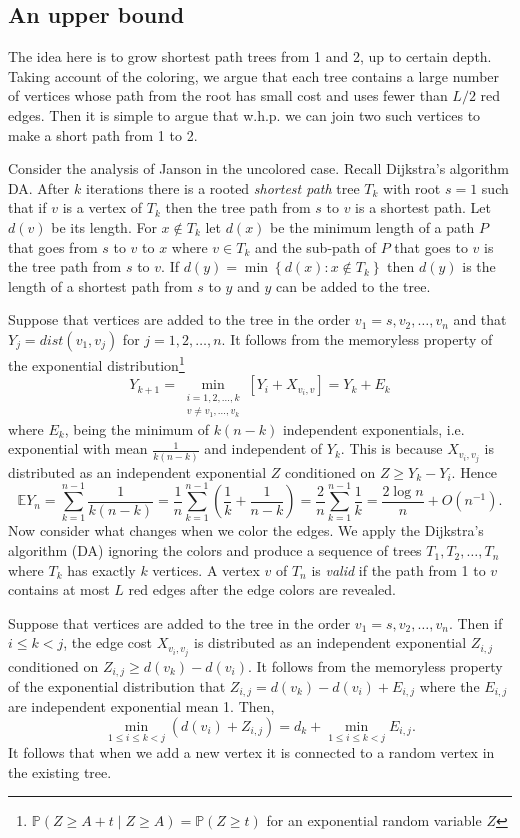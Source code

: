 \documentclass[12pt]{article}
\newcommand{\1}{\textbf{1}}
\newcommand{\set}[1]{\left\{#1\right\}}
\def\E{\mathbb{E}}
\def\Pr{\mathbb{P}}
\newcommand{\beq}[2]{\begin{equation}\label{#1}#2\end{equation}}
\begin{document}
\subsection{An upper bound}
The idea here is to grow shortest path trees from 1 and 2, up to certain depth. Taking account of the coloring, we argue that each tree contains a large number of vertices whose path from the root has small cost and uses fewer than $L/2$ red edges. Then it is simple to argue that w.h.p. we can join two such vertices to make a short path from 1 to 2. 

Consider the analysis of Janson \cite{J2} in the uncolored case. Recall Dijkstra's algorithm DA.
After $k$ iterations there is a rooted {\em shortest path} tree $T_k$ with root $s=1$ such that if
$v$ is a vertex of $T_k$ then the tree path from $s$ to $v$ is a shortest path. Let $d(v)$ be its length.
For $x\notin T_k$ let $d(x)$ be the minimum length of a path $P$ that goes from $s$ to $v$ to $x$ where $v\in T_k$ and the sub-path of $P$ that goes to $v$ is the tree path from $s$ to $v$. If $d(y)=\min\set{d(x):x\notin T_k}$ then $d(y)$ is the length of a shortest path from $s$ to $y$ and $y$ can be added to the tree.

Suppose that vertices are added to the tree in the order $v_1=s,v_2,\ldots,v_n$ and that $Y_j=dist(v_1,v_j)$ for $j=1,2,\ldots,n$. It follows from the memoryless property of the exponential distribution\footnote{$\Pr(Z\geq A+t\mid Z\geq A)=\Pr(Z\geq t)$ for an exponential random variable $Z$}
\[
Y_{k+1} = \min_{\substack{i=1,2,\ldots,k \\{v\neq v_1,\ldots,v_k}}}[Y_i+ X_{v_i,v}]=Y_k + E_k
\]
where $E_k$, being the minimum of $k(n-k)$ independent exponentials, i.e. exponential with mean $\frac{1}{k(n-k)}$ and independent of $Y_k$. This is because $X_{v_i,v_j}$ is distributed as an independent exponential $Z$ conditioned on $Z\geq Y_k-Y_i$. Hence
\beq{ELn}{
\E Y_n = \sum_{k=1}^{n-1}\frac{1}{k(n-k)} = \frac{1}{n}\sum_{k=1}^{n-1}\left(\frac{1}{k}+ \frac{1}{n-k}\right) = \frac{2}{n}\sum_{k=1}^{n-1}\frac{1}{k} = \frac{2\log n}{n}+O(n^{-1}).
}
Now consider what changes when we color the edges. We apply the Dijkstra's algorithm (DA) ignoring the colors and produce a sequence of trees $T_1,T_2,\ldots,T_n$ where $T_k$ has exactly $k$ vertices. A vertex $v$ of $T_n$  is {\em valid} if the path from 1 to $v$ contains at most $L$ red edges after the edge colors are revealed.

Suppose that vertices are added to the tree in the order $v_1=s,v_2,\ldots,v_n$. Then if $i\leq k<j$, the edge cost $X_{v_i,v_j}$ is distributed as an independent exponential $Z_{i,j}$ conditioned on $Z_{i,j}\geq d(v_k)-d(v_i)$.  It follows from the memoryless property of the exponential distribution that $Z_{i,j}=d(v_k)-d(v_i)+E_{i,j}$ where the $E_{i,j}$ are independent exponential mean 1. Then,
\[
 \min_{1\leq i\leq k<j}(d(v_i)+Z_{i,j})=d_k+\min_{1\leq i\leq k<j}E_{i,j}.
\]
It follows that  when we add a new vertex it is connected to a random vertex in the existing tree.
\end{document}
